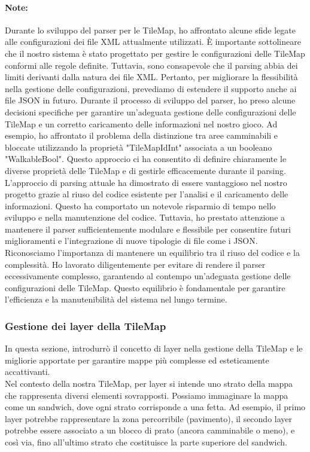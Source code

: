 \documentclass[a4paper,12pt]{report}
\begin{document}
\paragraph*{Note:}
Durante lo sviluppo del parser per le TileMap, ho affrontato alcune sfide legate alle configurazioni dei file XML attualmente utilizzati.
È importante sottolineare che il nostro sistema è stato progettato per gestire le configurazioni delle TileMap conformi alle regole definite. 
Tuttavia, sono consapevole che il parsing abbia dei limiti derivanti dalla natura dei file XML.
Pertanto, per migliorare la flessibilità nella gestione delle configurazioni, prevediamo di estendere il supporto anche ai file JSON in futuro.
Durante il processo di sviluppo del parser, ho preso alcune decisioni specifiche per garantire un'adeguata gestione delle configurazioni delle TileMap e un corretto caricamento delle informazioni nel nostro gioco. 
Ad esempio, ho affrontato il problema della distinzione tra aree camminabili e bloccate utilizzando la proprietà "TileMapIdInt" associata a un booleano "WalkableBool".
Questo approccio ci ha consentito di definire chiaramente le diverse proprietà delle TileMap e di gestirle efficacemente durante il parsing.
L'approccio di parsing attuale ha dimostrato di essere vantaggioso nel nostro progetto grazie al riuso del codice esistente per l'analisi e il caricamento delle informazioni.
Questo ha comportato un notevole risparmio di tempo nello sviluppo e nella manutenzione del codice. Tuttavia, ho prestato attenzione a mantenere il parser sufficientemente modulare e flessibile per consentire futuri miglioramenti e l'integrazione di nuove tipologie di file come i JSON.
Riconosciamo l'importanza di mantenere un equilibrio tra il riuso del codice e la complessità. 
Ho lavorato diligentemente per evitare di rendere il parser eccessivamente complesso, garantendo al contempo un'adeguata gestione delle configurazioni delle TileMap. 
Questo equilibrio è fondamentale per garantire l'efficienza e la manutenibilità del sistema nel lungo termine.
\\
\subsubsection*{Gestione dei layer della TileMap}
In questa sezione, introdurrò il concetto di layer nella gestione della TileMap e le migliorie apportate per garantire mappe più complesse ed esteticamente accattivanti.
\\
Nel contesto della nostra TileMap, per layer si intende uno strato della mappa che rappresenta diversi elementi sovrapposti. 
Possiamo immaginare la mappa come un sandwich, dove ogni strato corrisponde a una fetta. 
Ad esempio, il primo layer potrebbe rappresentare la zona percorribile (pavimento), il secondo layer potrebbe essere associato a un blocco di prato (ancora camminabile o meno), e così via, fino all'ultimo strato che costituisce la parte superiore del sandwich.
\end{document}
